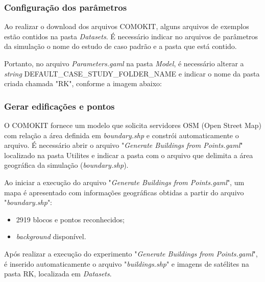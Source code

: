 \subsubsection{Configuração dos parâmetros}

Ao realizar o download dos arquivos COMOKIT, alguns arquivos de exemplos estão contidos na pasta \textit{Datasets}. É necessário indicar no arquivos de parâmetros da simulação o nome do estudo de caso padrão e a pasta que está contido. 

Portanto, no arquivo \textit{Parameters.gaml} na pasta \textit{Model}, é necessário alterar a \textit{string} DEFAULT\_CASE\_STUDY\_FOLDER\_NAME e indicar o nome da pasta criada chamada "RK", conforme a imagem abaixo:



\subsubsection{Gerar edificações e pontos}

O COMOKIT fornece um modelo que solicita servidores OSM (Open Street Map) com 
 relação a área definida em \textit{boundary.shp} e constrói automaticamente o arquivo. 
É necessário abrir o arquivo "\textit{Generate Buildings from Points.gaml}"  localizado na pasta Utilites e indicar a pasta com o arquivo que delimita a área geográfica da simulação (\textit{boundary.shp}).


Ao iniciar a execução do arquivo "\textit{Generate Buildings from Points.gaml}", um mapa é apresentado com informações geográficas obtidas a partir do arquivo "\textit{boundary.shp}":

\begin{itemize}
\item 2919 blocos e pontos reconhecidos;
\item \textit{background} disponível.
\end{itemize}



Após realizar a execução do experimento "\textit{Generate Buildings from Points.gaml}", é inserido automaticamente o arquivo "\textit{buildings.shp}" e imagens de satélites na pasta RK, localizada em \textit{Datasets}.

